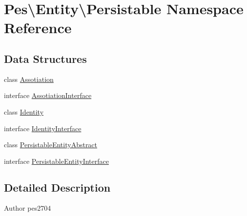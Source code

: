 \hypertarget{namespace_pes_1_1_entity_1_1_persistable}{}\section{Pes\textbackslash{}Entity\textbackslash{}Persistable Namespace Reference}
\label{namespace_pes_1_1_entity_1_1_persistable}
\subsection*{Data Structures}
\begin{DoxyCompactItemize}
\item 
class \mbox{\hyperlink{class_pes_1_1_entity_1_1_persistable_1_1_assotiation}{Assotiation}}
\item 
interface \mbox{\hyperlink{interface_pes_1_1_entity_1_1_persistable_1_1_assotiation_interface}{Assotiation\+Interface}}
\item 
class \mbox{\hyperlink{class_pes_1_1_entity_1_1_persistable_1_1_identity}{Identity}}
\item 
interface \mbox{\hyperlink{interface_pes_1_1_entity_1_1_persistable_1_1_identity_interface}{Identity\+Interface}}
\item 
class \mbox{\hyperlink{class_pes_1_1_entity_1_1_persistable_1_1_persistable_entity_abstract}{Persistable\+Entity\+Abstract}}
\item 
interface \mbox{\hyperlink{interface_pes_1_1_entity_1_1_persistable_1_1_persistable_entity_interface}{Persistable\+Entity\+Interface}}
\end{DoxyCompactItemize}


\subsection{Detailed Description}
\begin{DoxyAuthor}{Author}
pes2704 
\end{DoxyAuthor}
